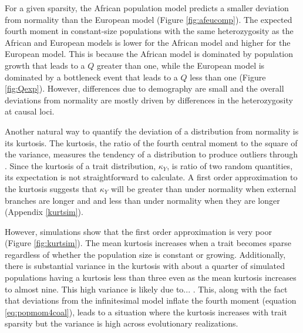 For a given sparsity, the African population model predicts a smaller deviation
from normality than the European model (Figure \ref{fig:afeucomp}). The expected
fourth moment in constant-size populations with the same heterozygosity as the
African and European models is lower for the African model and higher for the
European model. This is because the African model is dominated by population
growth that leads to a $Q$ greater than one, while the European model is
dominated by a bottleneck event that leads to a $Q$ less than one
(Figure \ref{fig:Qexp}). However, differences due to demography are small and
the overall deviations from normality are mostly driven by differences in the
heterozygosity at causal loci.

Another natural way to quantify the deviation of a distribution from normality
is its kurtosis. The kurtosis, the ratio of the fourth central moment to the
square of the variance, measures the tendency of a distribution to produce
outliers through \citep{Westfall2014}. Since the kurtosis of a trait
distribution, $\kappa_Y$, is ratio of two random quantities, its expectation is
not straightforward to calculate. A first order approximation to the kurtosis
suggests that $\kappa_Y$ will be greater than under normality when external
branches are longer and and less than under normality when they are longer
(Appendix \ref{kurtsim}).

However, simulations show that the first order approximation is very poor
(Figure \ref{fig:kurtsim}). The mean kurtosis increases when a trait becomes
sparse regardless of whether the population size is constant or growing.
Additionally, there is substantial variance in the kurtosis with about a quarter
of simulated populations having a kurtosis less than three even as the mean
kurtosis increases to almost nine. This high variance is likely due to... . This,
along with the fact that deviations from the infinitesimal model inflate the
fourth moment (equation \eqref{eq:popmom4coal}), leads to a situation where the
kurtosis increases with trait sparsity but the variance is high across
evolutionary realizations.
